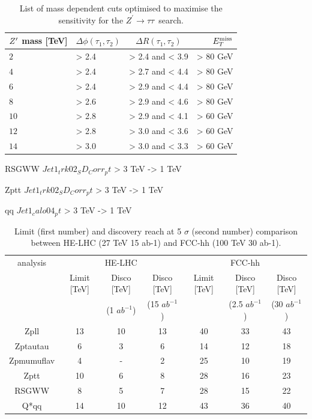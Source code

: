 \documentclass{cernrep}
\newcommand*{\Zptata}{\ensuremath{Z^{\prime}\rightarrow \tau\tau}}
\newcommand*{\met}{\ensuremath{E_{T}^{\rm{miss}}}}
\begin{document}
\begin{table}[htbp]
   \centering
\begin{tabular}{|l|l|c|r|}
  \hline
  \hline
   $Z^{\prime}$ mass [TeV] &  $\Delta \phi(\tau_1, \tau_2)$&  $\Delta R(\tau_1, \tau_2)$ & $\met$\\
  \hline
   $2$ & > 2.4 & > 2.4 and < 3.9 & > 80 GeV\\
   $4$ & > 2.4 & > 2.7 and < 4.4 & > 80 GeV\\
   $6$ & > 2.4 & > 2.9 and < 4.4 & > 80 GeV\\
   $8$ & > 2.6 & > 2.9 and < 4.6 & > 80 GeV\\
  $10$ & > 2.8 & > 2.9 and < 4.1 & > 60 GeV\\
  $12$ & > 2.8 & > 3.0 and < 3.6 & > 60 GeV\\
  $14$ & > 3.0 & > 3.0 and < 3.3 & > 60 GeV\\
  \hline
  \hline
  \end{tabular}
  \caption{List of mass dependent cuts optimised to maximise the sensitivity for the \Zptata\ search.}
  \label{tab:leptonicresonances:selectiontautau27}
\end{table}

RSGWW
$Jet1_trk02_SD_Corr_pt$ > 3 TeV -> 1 TeV

Zptt
$Jet1_trk02_SD_Corr_pt$ > 3 TeV -> 1 TeV

qq
$Jet1_calo04_pt$ > 3 TeV -> 1 TeV


\begin{table}[!htb]\centering
\begin{tabular}{|c|c|c|c|c|c|c|}
\hline
\hline
analysis   & \multicolumn{3}{c|}{HE-LHC} & \multicolumn{3}{c|}{FCC-hh} \\
           & Limit [TeV] & Disco [TeV]   & Disco [TeV]    & Limit [TeV] & Disco [TeV] & Disco [TeV] \\
           &             & (1 $ab^{-1}$) & (15 $ab^{-1}$) &             & (2.5 $ab^{-1}$) & (30 $ab^{-1}$)  \\
\hline
Zpll       & 13 & 10 & 13 & 40 & 33 & 43 \\
Zptautau   &  6 &  3 &  6 & 14 & 12 & 18 \\
Zpmumuflav &  4 &  - &  2 & 25 & 10 & 19 \\
Zptt       & 10 &  6 &  8 & 28 & 16 & 23 \\
RSGWW      &  8 &  5 &  7 & 28 & 15 & 22 \\
Q*qq       & 14 & 10 & 12 & 43 & 36 & 40 \\
\hline
\hline
\end{tabular}
\caption{Limit (first number) and discovery reach at 5 $\sigma$ (second number) comparison between HE-LHC (27 TeV 15 ab-1) and FCC-hh (100 TeV 30 ab-1).}
\label{tab:27vs100}
\end{table}
\end{document}
